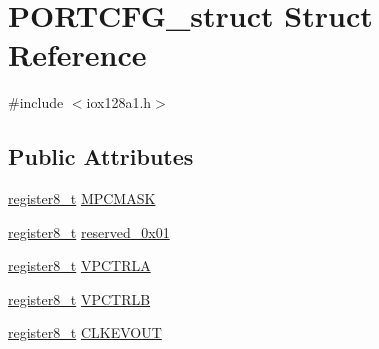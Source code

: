 \hypertarget{struct_p_o_r_t_c_f_g__struct}{
\section{PORTCFG\_\-struct Struct Reference}
\label{struct_p_o_r_t_c_f_g__struct}
}


{\ttfamily \#include $<$iox128a1.h$>$}

\subsection*{Public Attributes}
\begin{DoxyCompactItemize}
\item 
\hyperlink{iox128a1_8h_a6a0649252b392263406882923b04a9db}{register8\_\-t} \hyperlink{struct_p_o_r_t_c_f_g__struct_a18137f5cc66037f33b8b2d9fbd93125a}{MPCMASK}
\item 
\hyperlink{iox128a1_8h_a6a0649252b392263406882923b04a9db}{register8\_\-t} \hyperlink{struct_p_o_r_t_c_f_g__struct_a18f13a9d6b6a644d548e6008f876e327}{reserved\_\-0x01}
\item 
\hyperlink{iox128a1_8h_a6a0649252b392263406882923b04a9db}{register8\_\-t} \hyperlink{struct_p_o_r_t_c_f_g__struct_a6fac78b86e90318e180ad682e84a3516}{VPCTRLA}
\item 
\hyperlink{iox128a1_8h_a6a0649252b392263406882923b04a9db}{register8\_\-t} \hyperlink{struct_p_o_r_t_c_f_g__struct_a8819c9ec352e390fe1c9b28a6feb7d2e}{VPCTRLB}
\item 
\hyperlink{iox128a1_8h_a6a0649252b392263406882923b04a9db}{register8\_\-t} \hyperlink{struct_p_o_r_t_c_f_g__struct_ad5989612713da42329d0a3e4b26c692e}{CLKEVOUT}
\end{DoxyCompactItemize}


